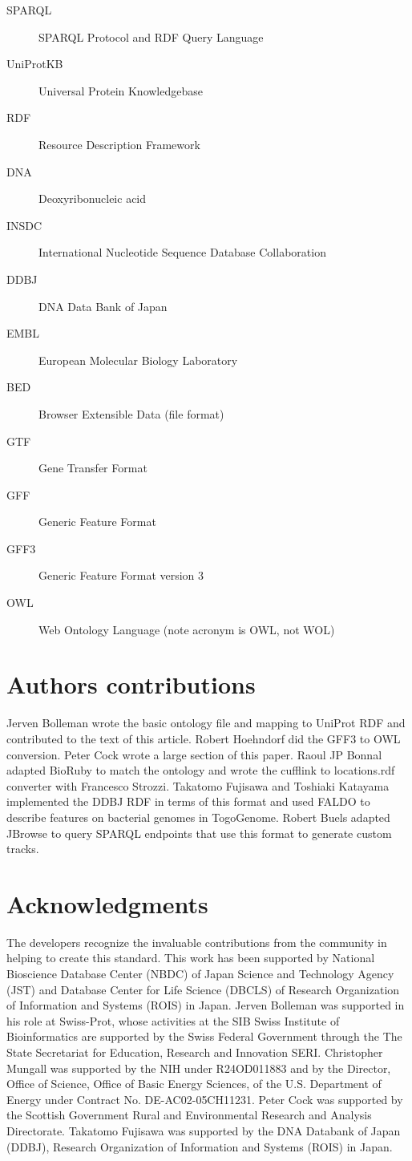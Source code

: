 \documentclass[10pt]{bmc_article}
\newenvironment{bmcformat}{\begin{raggedright}\baselineskip20pt\sloppy\setboolean{publ}{false}}{\end{raggedright}\baselineskip20pt\sloppy}
\begin{document}
\begin{bmcformat}
\begin{description}
\item[SPARQL] SPARQL Protocol and RDF Query Language
\item[UniProtKB] Universal Protein Knowledgebase 
\item[RDF] Resource Description Framework
\item[DNA] Deoxyribonucleic acid
\item[INSDC] International Nucleotide Sequence Database Collaboration
\item[DDBJ] DNA Data Bank of Japan
\item[EMBL] European Molecular Biology Laboratory
\item[BED] Browser Extensible Data (file format)
\item[GTF] Gene Transfer Format
\item[GFF] Generic Feature Format
\item[GFF3] Generic Feature Format version 3
\item[OWL] Web Ontology Language (note acronym is OWL, not WOL)
\end{description}
\bigskip

\section*{Authors contributions}

Jerven Bolleman wrote the basic ontology file and mapping to UniProt RDF and contributed to the text of this article.
Robert Hoehndorf did the GFF3 to OWL conversion.
Peter Cock wrote a large section of this paper.
Raoul JP Bonnal adapted BioRuby to match the ontology and wrote the cufflink to locations.rdf converter with Francesco Strozzi.
Takatomo Fujisawa and Toshiaki Katayama implemented the DDBJ RDF in terms of this format and used FALDO to describe features on bacterial genomes in TogoGenome.
Robert Buels adapted JBrowse to query SPARQL endpoints that use this format to generate custom tracks. 

\section*{Acknowledgments}
The developers recognize the invaluable contributions from the community in helping to create this standard.
This work has been supported by National Bioscience Database Center (NBDC) of Japan Science and Technology Agency (JST) and Database Center for Life Science (DBCLS) of Research Organization of Information and Systems (ROIS) in Japan.
Jerven Bolleman was supported in his role at Swiss-Prot, whose activities at the SIB Swiss Institute of Bioinformatics are supported by the Swiss Federal Government through the The State Secretariat for Education, Research and Innovation SERI.
Christopher Mungall was supported by the NIH under R24OD011883 and by the Director, Office of Science, Office of Basic Energy Sciences, of the U.S. Department of Energy under Contract No. DE-AC02-05CH11231.
Peter Cock was supported by the Scottish Government Rural and Environmental Research and Analysis Directorate.
Takatomo Fujisawa was supported by the DNA Databank of Japan (DDBJ), Research Organization of Information and Systems (ROIS) in Japan.


\end{bmcformat}
\end{document}
